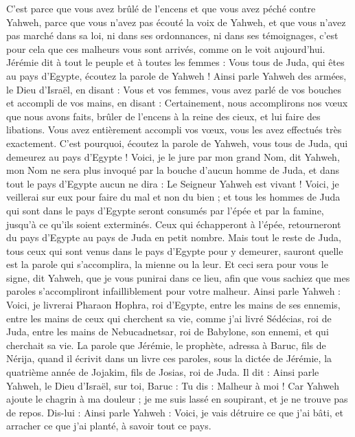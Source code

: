 \begin{multicols}{2}
C’est parce que vous avez brûlé de l’encens et que vous avez péché contre Yahweh, parce que vous n'avez pas écouté la voix de Yahweh, et que vous n'avez pas marché dans sa loi, ni dans ses ordonnances, ni dans ses témoignages, c’est pour cela que ces malheurs vous sont arrivés, comme on le voit aujourd'hui.
Jérémie dit à tout le peuple et à toutes les femmes : Vous tous de Juda, qui êtes au pays d'Egypte, écoutez la parole de Yahweh !
Ainsi parle Yahweh des armées, le Dieu d'Israël, en disant : Vous et vos femmes, vous avez parlé de vos bouches et accompli de vos mains, en disant : Certainement, nous accomplirons nos vœux que nous avons faits, brûler de l’encens à la reine des cieux, et lui faire des libations. Vous avez entièrement accompli vos vœux, vous les avez effectués très exactement.
C'est pourquoi, écoutez la parole de Yahweh, vous tous de Juda, qui demeurez au pays d'Egypte ! Voici, je le jure par mon grand Nom, dit Yahweh, mon Nom ne sera plus invoqué par la bouche d'aucun homme de Juda, et dans tout le pays d'Egypte aucun ne dira : Le Seigneur Yahweh est vivant !
Voici, je veillerai sur eux pour faire du mal et non du bien ; et tous les hommes de Juda qui sont dans le pays d'Egypte seront consumés par l'épée et par la famine, jusqu’à ce qu'ils soient exterminés.
Ceux qui échapperont à l'épée, retourneront du pays d'Egypte au pays de Juda en petit nombre. Mais tout le reste de Juda, tous ceux qui sont venus dans le pays d'Egypte pour y demeurer, sauront quelle est la parole qui s'accomplira, la mienne ou la leur.
Et ceci sera pour vous le signe, dit Yahweh, que je vous punirai dans ce lieu, afin que vous sachiez que mes paroles s’accompliront infailliblement pour votre malheur.
Ainsi parle Yahweh : Voici, je livrerai Pharaon Hophra, roi d'Egypte, entre les mains de ses ennemis, entre les mains de ceux qui cherchent sa vie, comme j'ai livré Sédécias, roi de Juda, entre les mains de Nebucadnetsar, roi de Babylone, son ennemi, et qui cherchait sa vie.
\VerseOne{}La parole que Jérémie, le prophète, adressa à  Baruc, fils de Nérija, quand il écrivit dans un livre ces paroles, sous la dictée de Jérémie, la quatrième année de Jojakim, fils de Josias, roi de Juda. Il dit :
Ainsi parle Yahweh, le Dieu d'Israël, sur toi, Baruc :
Tu dis : Malheur à moi ! Car Yahweh ajoute le chagrin à ma douleur ; je me suis lassé en soupirant, et je ne trouve pas de repos.
Dis-lui : Ainsi parle Yahweh : Voici, je vais détruire ce que j'ai bâti, et arracher ce que j'ai planté, à savoir tout ce pays.

\end{multicols}
